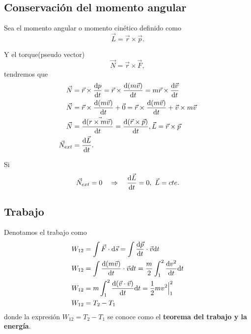 \documentclass[../main]{subfiles}
\begin{document}
\subsection{Conservación del momento angular}

Sea el momento angular o momento cinético definido como 
\begin{equation}
    \vec{L}=\vec{r}\times \vec{p}.
\end{equation}

Y el torque(pseudo vector)
\begin{equation}
    \vec{N}=\vec{r}\times \vec{F},
\end{equation}
tendremos que
\begin{align}
    \vec{N}&=\vec{r}\times \dv{p}{t}=\vec{r}\times \dv{(m\vec{v})}{t}=m\vec{r}\times \dv{\vec{v}}{t}\\
    \vec{N}&=\vec{r}\times \dv{(m\vec{v})}{t}+\vec{0}=\vec{r}\times \dv{(m\vec{v})}{t}+\vec{v}\times m\vec{v}\\
    \vec{N}&=\dv{(\vec{r\times m\vec{v}})}{t}=\dv{(\vec{r}\times \vec{p})}{t}, \vec{L}=\vec{r}\times \vec{p}\\
    \vec{N}_{ext}&=\dv{\vec{L}}{t}.
\end{align}

Si 
\begin{equation}
    \vec{N}_{ext}=0 \quad \Rightarrow \quad \dv{\vec{L}}{t}=0, \ \vec{L}=cte.
\end{equation}

\subsection{Trabajo}
Denotamos el trabajo como
\begin{align}
    W_{12}&=\int \vec{F}\cdot \mathrm{d}\vec{s}=\int \dv{\vec{p}}{t}\cdot \vec{v}\mathrm{d}t\\
    W_{12}&=\int \dv{(m\vec{v})}{t}\cdot \vec{v}dt=\dfrac{m}{2}\int_1^2 \dv{v^2}{t}\mathrm{d}t \\
    W_{12}&=m\int_1^2 \dv{(\vec{v}\cdot \vec{v})}{t}\mathrm{d}t=\dfrac{1}{2}mv^2 \Big{|}_1^2 \\
    W_{12}&=T_2-T_1
\end{align}
donde la expresión $W_{12}=T_2-T_1$ se conoce como el \textbf{teorema del trabajo y la energía}.
\end{document}
